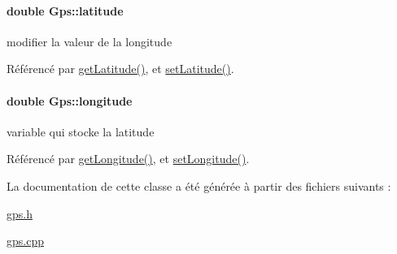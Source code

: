 \paragraph[{\texorpdfstring{latitude}{latitude}}]{\setlength{\rightskip}{0pt plus 5cm}double Gps\+::latitude\hspace{0.3cm}{\ttfamily [private]}}\hypertarget{class_gps_a2457bce0fe69afbf68c27a4807c3f847}{}\label{class_gps_a2457bce0fe69afbf68c27a4807c3f847}
modifier la valeur de la longitude 

Référencé par \hyperlink{class_gps_a44c6469bf67727853c06d4be037c6b0f}{get\+Latitude()}, et \hyperlink{class_gps_aaabf328f0bbcdbb9c2901e30b6edccc7}{set\+Latitude()}.

\paragraph[{\texorpdfstring{longitude}{longitude}}]{\setlength{\rightskip}{0pt plus 5cm}double Gps\+::longitude\hspace{0.3cm}{\ttfamily [private]}}\hypertarget{class_gps_a6e56fa2b9f1402901a0c768b796402ce}{}\label{class_gps_a6e56fa2b9f1402901a0c768b796402ce}
variable qui stocke la latitude 

Référencé par \hyperlink{class_gps_a6ce8da770e213bfbf7f204b107d9e3f5}{get\+Longitude()}, et \hyperlink{class_gps_a2d9ca07c62c5bae627c2131062a1236a}{set\+Longitude()}.



La documentation de cette classe a été générée à partir des fichiers suivants \+:\begin{DoxyCompactItemize}
\item 
\hyperlink{gps_8h}{gps.\+h}\item 
\hyperlink{gps_8cpp}{gps.\+cpp}\end{DoxyCompactItemize}
